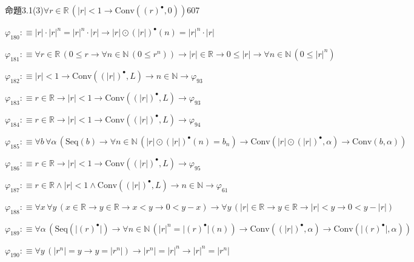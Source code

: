 \begin{fullproof}{命題3.1(3)}{$\forall r \in \mathbb{R}\,(\lvert r \rvert < 1 \to \mathrm{Conv}({(r)^{\bullet}},0))$}{607}
\begin{abbrevlist}
\item $\varphi_{180} :\equiv \lvert r \rvert \cdot {{\lvert r \rvert}^{n}} = {{\lvert r \rvert}^{n}} \cdot \lvert r \rvert \to \lvert r \rvert \odot {(\lvert r \rvert)^{\bullet}}(n) = {{\lvert r \rvert}^{n}} \cdot \lvert r \rvert$
\item $\varphi_{181} :\equiv \forall r \in \mathbb{R}\,(0 \leq r \to \forall n \in \mathbb{N}\,(0 \leq {{r}^{n}})) \to \lvert r \rvert \in \mathbb{R} \to 0 \leq \lvert r \rvert \to \forall n \in \mathbb{N}\,(0 \leq {{\lvert r \rvert}^{n}})$
\item $\varphi_{182} :\equiv \lvert r \rvert < 1 \to \mathrm{Conv}({(\lvert r \rvert)^{\bullet}},L) \to n \in \mathbb{N} \to \varphi_{93}$
\item $\varphi_{183} :\equiv r \in \mathbb{R} \to \lvert r \rvert < 1 \to \mathrm{Conv}({(\lvert r \rvert)^{\bullet}},L) \to \varphi_{93}$
\item $\varphi_{184} :\equiv r \in \mathbb{R} \to \lvert r \rvert < 1 \to \mathrm{Conv}({(\lvert r \rvert)^{\bullet}},L) \to \varphi_{94}$
\item $\varphi_{185} :\equiv \forall b\,\forall \alpha\,(\mathrm{Seq}(b) \to \forall n \in \mathbb{N}\,(\lvert r \rvert \odot {(\lvert r \rvert)^{\bullet}}(n) = b_{n}) \to \mathrm{Conv}(\lvert r \rvert \odot {(\lvert r \rvert)^{\bullet}},\alpha) \to \mathrm{Conv}(b,\alpha))$
\item $\varphi_{186} :\equiv r \in \mathbb{R} \to \lvert r \rvert < 1 \to \mathrm{Conv}({(\lvert r \rvert)^{\bullet}},L) \to \varphi_{95}$
\item $\varphi_{187} :\equiv r \in \mathbb{R} \land \lvert r \rvert < 1 \land \mathrm{Conv}({(\lvert r \rvert)^{\bullet}},L) \to n \in \mathbb{N} \to \varphi_{61}$
\item $\varphi_{188} :\equiv \forall x\,\forall y\,(x \in \mathbb{R} \to y \in \mathbb{R} \to x < y \to 0 < y - x) \to \forall y\,(\lvert r \rvert \in \mathbb{R} \to y \in \mathbb{R} \to \lvert r \rvert < y \to 0 < y - \lvert r \rvert)$
\item $\varphi_{189} :\equiv \forall \alpha\,(\mathrm{Seq}(\lvert {(r)^{\bullet}} \rvert) \to \forall n \in \mathbb{N}\,({{\lvert r \rvert}^{n}} = \lvert {(r)^{\bullet}} \rvert(n)) \to \mathrm{Conv}({(\lvert r \rvert)^{\bullet}},\alpha) \to \mathrm{Conv}(\lvert {(r)^{\bullet}} \rvert,\alpha))$
\item $\varphi_{190} :\equiv \forall y\,(\lvert {{r}^{n}} \rvert = y \to y = \lvert {{r}^{n}} \rvert) \to \lvert {{r}^{n}} \rvert = {{\lvert r \rvert}^{n}} \to {{\lvert r \rvert}^{n}} = \lvert {{r}^{n}} \rvert$

\end{abbrevlist}
\end{fullproof}
